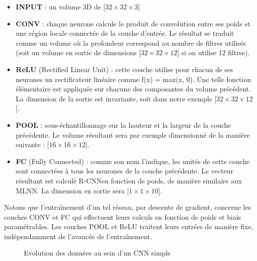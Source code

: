       \begin{itemize}
	\item \textbf{INPUT} : un volume 3D de [$32 \times 32 \times 3$]
	\item \textbf{CONV} : chaque neurone calcule le produit de convolution entre ses poids et une région locale connectée de la couche d’entrée. Le résultat se traduit comme un volume où la profondeur correspond au nombre de filtres utilisés (soit un volume en sortie de dimensions [$32 \times 32 \times 12$] si on utilise 12 filtres).

	\item \textbf{ReLU} (Rectified Linear Unit) : cette couche utilise pour chacun de ses neurones un rectificateur linéaire comme f(x) = max(x, 0). Une telle fonction élémentaire est appliquée sur chacune des composantes du volume précédent. La dimension de la sortie est invariante, soit dans notre exemple [$32 \times 32 \times 12$]. 
	\item \textbf{POOL} : sous-échantillonnage sur la hauteur et la largeur de la couche précédente. Le volume résultant sera par exemple dimensionné de la manière suivante : [$16 \times 16 \times 12$].
	\item \textbf{FC} (Fully Connected) : comme son nom l’indique, les unités de cette couche sont connectées à tous les neurones de la couche précédente. Le vecteur résultant est calculé R-CNNen fonction de poids, de manière similaire aux \gls{MLNN}. La dimension en sortie sera [$1 \times 1 \times 10$].

      \end{itemize}
      Notons que l’entraînement d’un tel réseau, par descente de gradient, concerne les couches CONV et FC qui effectuent leurs calculs en fonction de poids et biais paramétrables. Les couches POOL et ReLU traitent leurs entrées de manière fixe, indépendamment de l’avancée de l’entraînement.

      \begin{figure}[H]
	  \centering
	  \caption{Evolution des données au sein d'un \gls{CNN} simple}
	  \label{fig:c1p3s1}
      \end{figure}

